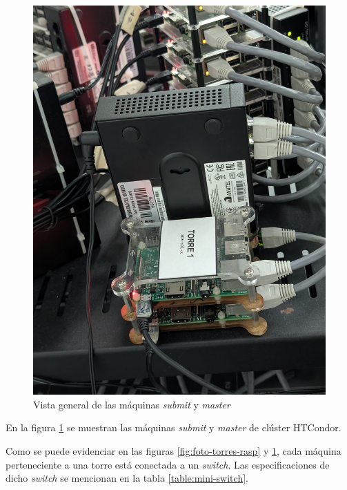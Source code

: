 \begin{figure}[H]
	\centering
	\includegraphics[scale=0.065]{tablas-images/raspberries/torre-binaria.jpeg}
	\caption{Vista general de las máquinas \textit{submit } y \textit{master}}
	\label{fig:foto-torre-binaria}
\end{figure}



\noindent
En la figura \ref{fig:foto-torre-binaria} se muestran las máquinas \textit{submit } y \textit{master} de clúster HTCondor.

\noindent
Como se puede evidenciar en las figuras \ref{fig:foto-torres-rasp} y \ref{fig:foto-torre-binaria}, cada máquina perteneciente a una torre está conectada a un \textit{switch}. Las especificaciones de dicho \textit{switch} se mencionan en la tabla \ref{table:mini-switch}.




